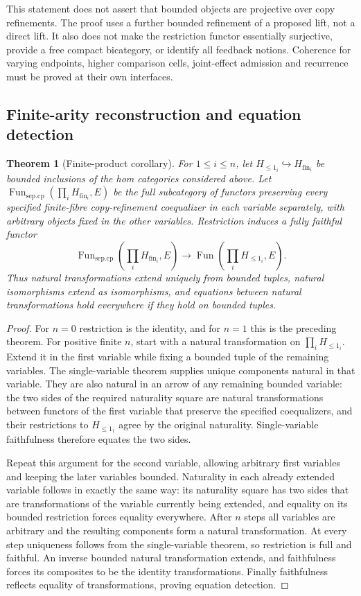 \documentclass[11pt]{article}
\newtheorem{theorem}{Theorem}
\newcommand{\Ha}{H_{\leq 1}}
\newcommand{\HM}{H_{\mathrm{fin}}}
\newcommand{\Hh}{\HM}
\newcommand{\Bb}{\Ha}
\begin{document}
This statement does not assert that bounded objects are projective over
copy refinements. The proof uses a further bounded refinement of a proposed
lift, not a direct lift. It also does not make the restriction functor
essentially surjective, provide a free compact bicategory, or identify all
feedback notions. Coherence for varying endpoints, higher comparison cells,
joint-effect admission and recurrence must be proved at their own interfaces.

\subsection{Finite-arity reconstruction and equation detection}
\begin{theorem}[Finite-product corollary]
For $1\leq i\leq n$, let $\Bb_i\hookrightarrow\Hh_i$ be bounded inclusions
of the hom categories considered above. Let
$\operatorname{Fun}_{\mathrm{sep.cp}}(\prod_i\Hh_i,E)$ be the full
subcategory of functors preserving every specified finite-fibre
copy-refinement coequalizer in each variable separately, with arbitrary
objects fixed in the other variables. Restriction induces a fully faithful
functor
\[
 \operatorname{Fun}_{\mathrm{sep.cp}}(\prod_i\Hh_i,E)
 \longrightarrow \operatorname{Fun}(\prod_i\Bb_i,E).
\]
Thus natural transformations extend uniquely from bounded tuples, natural
isomorphisms extend as isomorphisms, and equations between natural
transformations hold everywhere if they hold on bounded tuples.
\end{theorem}
\begin{proof}
For $n=0$ restriction is the identity, and for $n=1$ this is the preceding
theorem. For positive finite $n$, start with a natural transformation on
$\prod_i\Bb_i$. Extend it in the first variable while fixing a bounded
tuple of the remaining variables. The single-variable theorem supplies
unique components natural in that variable. They are also natural in an
arrow of any remaining bounded variable: the two sides of the required
naturality square are natural transformations between functors of the first
variable that preserve the specified coequalizers, and their restrictions
to $\Bb_1$ agree by the original naturality. Single-variable faithfulness
therefore equates the two sides.

Repeat this argument for the second variable, allowing arbitrary first
variables and keeping the later variables bounded. Naturality in each
already extended variable follows in exactly the same way: its naturality
square has two sides that are transformations of the variable currently
being extended, and equality on its bounded restriction forces equality
everywhere. After $n$ steps all variables are arbitrary and the resulting
components form a natural transformation. At every step uniqueness follows
from the single-variable theorem, so restriction is full and faithful.
An inverse bounded natural transformation extends, and faithfulness forces
its composites to be the identity transformations. Finally faithfulness
reflects equality of transformations, proving equation detection.
\end{proof}
\end{document}
